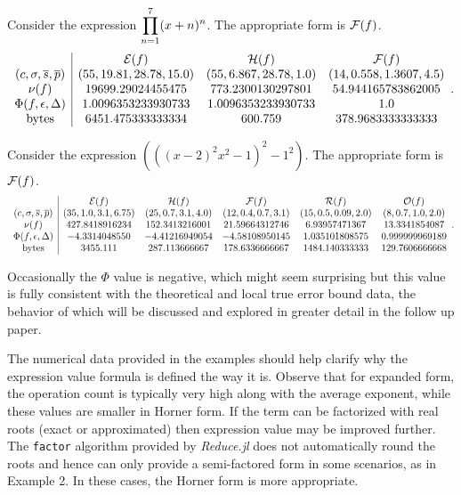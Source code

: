 \documentclass[]{elsarticle}
\begin{document}
\begin{example}
	Consider the expression $\displaystyle\prod_{n=1}^7 (x+n)^n$.
	The appropriate form is $\mathcal{F}(f)$.
	$$\begin{array}{c|cccc}
		& \mathcal{E}(f) & \mathcal{H}(f) & \mathcal{F}(f) \\
		(c,\sigma,\overline{s},\overline{p}) & (55, 19.81, 28.78, 15.0) & (55, 6.867, 28.78, 1.0) & (14, 0.558, 1.3607, 4.5) \\
		\nu(f) & 19699.29024455475 & 773.2300130297801 & 54.944165783862005 \\
		\Phi(f,\epsilon,\Delta) & 1.0096353233930733 & 1.0096353233930733 & 1.0 \\
		\text{bytes} & 6451.475333333334 & 600.759 & 378.9683333333333
	\end{array}. $$
\end{example}
\begin{example}
	Consider the expression $(((x-2)^2x^2-1)^2-1^2)$.
	The appropriate form is $\mathcal{F}(f)$.
	$$\begin{array}{c|ccccc}
		& \mathcal{E}(f) & \mathcal{H}(f) & \mathcal{F}(f) & \mathcal{R}(f) & \mathcal{O}(f) \\
		(c,\sigma,\overline{s},\overline{p}) & (35, 1.0, 3.1, 6.75) & (25, 0.7, 3.1, 4.0) & (12, 0.4, 0.7, 3.1) & (15, 0.5, 0.09, 2.0) & (8, 0.7, 1.0, 2.0) \\
		\nu(f) & 427.8418916234 & 152.3413216001 & 21.59664312746 & 6.93957471367 & 13.3341854087 \\
		\Phi(f,\epsilon,\Delta) & -4.3314048550 & -4.41216949054 & -4.58108950145 & 1.035101808575 & 0.999999969189 \\
		\text{bytes} & 3455.111 & 287.113666667 & 178.6336666667 & 1484.140333333 & 129.7606666668
	\end{array}. $$
\end{example}

\begin{remark}
	Occasionally the $\Phi$ value is negative, which might seem surprising but this value is fully consistent with the theoretical and local true error bound data, the behavior of which will be discussed and explored in greater detail in the follow up paper.
\end{remark}

The numerical data provided in the examples should help clarify why the expression value formula is defined the way it is. Observe that for expanded form, the operation count is typically very high along with the average exponent, while these values are smaller in Horner form. 
If the term can be factorized with real roots (exact or approximated) then expression value may be improved further.
The \verb+factor+ algorithm provided by \textit{Reduce.jl} does not automatically round the roots and hence can only provide a semi-factored form in some scenarios, as in Example 2. In these cases, the Horner form is more appropriate.
\end{document}
